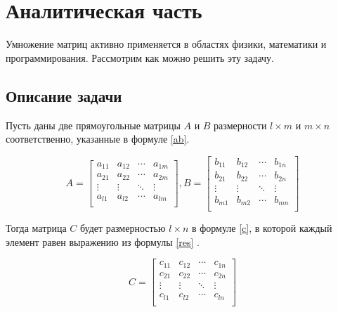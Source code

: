 \documentclass[a4paper,12pt]{article}
\begin{document}
\newpage
\section{Аналитическая часть}

Умножение матриц активно применяется в областях физики, математики и программирования.
Рассмотрим как можно решить эту задачу.

\subsection{Описание задачи}

Пусть даны две прямоугольные матрицы $A$ и $B$ размерности $l \times m$ и $m \times n$
соответственно, указанные в формуле \ref{ab}.

\begin{equation}\label{ab}
    A =
    \left[
        \begin{matrix}
            a_{11} & a_{12} & \cdots & a_{1m} \\
            a_{21} & a_{22} & \cdots & a_{2m} \\
            \vdots & \vdots & \ddots & \vdots \\
            a_{l1} & a_{l2} & \cdots & a_{lm} \\
        \end{matrix}
    \right],
    B =
    \left[
        \begin{matrix}
            b_{11} & b_{12} & \cdots & b_{1n} \\
            b_{21} & b_{22} & \cdots & b_{2n} \\
            \vdots & \vdots & \ddots & \vdots \\
            b_{m1} & b_{m2} & \cdots & b_{mn} \\
        \end{matrix}
    \right]
\end{equation}

Тогда матрица $C$ будет размерностью $l \times n$ в формуле \ref{c}, в которой
каждый элемент равен выражению из формулы \ref{res} \cite{litr}.

\begin{equation}\label{c}
    C =
    \left[
        \begin{matrix}
            c_{11} & c_{12} & \cdots & c_{1n} \\
            c_{21} & c_{22} & \cdots & c_{2n} \\
            \vdots & \vdots & \ddots & \vdots \\
            c_{l1} & c_{l2} & \cdots & c_{ln} \\
        \end{matrix}
    \right]
\end{equation}
\end{document}
